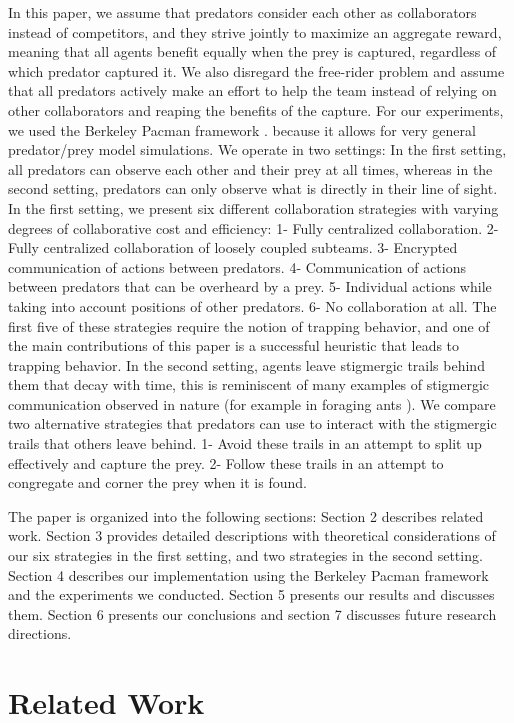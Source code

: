 \documentclass[11pt]{article}
\begin{document}
\begin{multicols}{2}
In this paper, we assume that predators consider each other as collaborators instead of competitors, and they strive jointly to maximize an aggregate reward, meaning that all agents benefit equally when the prey is captured, regardless of which predator captured it. We also disregard the free-rider problem and assume that all predators actively make an effort to help the team instead of relying on other collaborators and reaping the benefits of the capture. For our experiments, we used the Berkeley Pacman framework \cite{Pacman}. because it allows for very general predator/prey model simulations. We operate in two settings: In the first setting, all predators can observe each other and their prey at all times, whereas in the second setting, predators can only observe what is directly in their line of sight. In the first setting, we present six different collaboration strategies with varying degrees of collaborative cost and efficiency: 1- Fully centralized collaboration. 2- Fully centralized collaboration of loosely coupled subteams. 3- Encrypted communication of actions between predators. 4- Communication of actions between predators that can be overheard by a prey. 5- Individual actions while taking into account positions of other predators. 6- No collaboration at all. The first five of these strategies require the notion of trapping behavior, and one of the main contributions of this paper is a successful heuristic that leads to trapping behavior. In the second setting, agents leave stigmergic trails behind them that decay with time, this is reminiscent of many examples of stigmergic communication observed in nature (for example in foraging ants \cite{beckers1992trails}). We compare two alternative strategies that predators can use to interact with the stigmergic trails that others leave behind. 1- Avoid these trails in an attempt to split up effectively and capture the prey. 2- Follow these trails in an attempt to congregate and corner the prey when it is found.

The paper is organized into the following sections: Section 2 describes related work. Section 3 provides detailed descriptions with theoretical considerations of our six strategies in the first setting, and two strategies in the second setting. Section 4 describes our implementation using the Berkeley Pacman framework and the experiments we conducted. Section 5 presents our results and discusses them. Section 6 presents our conclusions and section 7 discusses future research directions. 

\section{Related Work}


\end{multicols}
\end{document}

